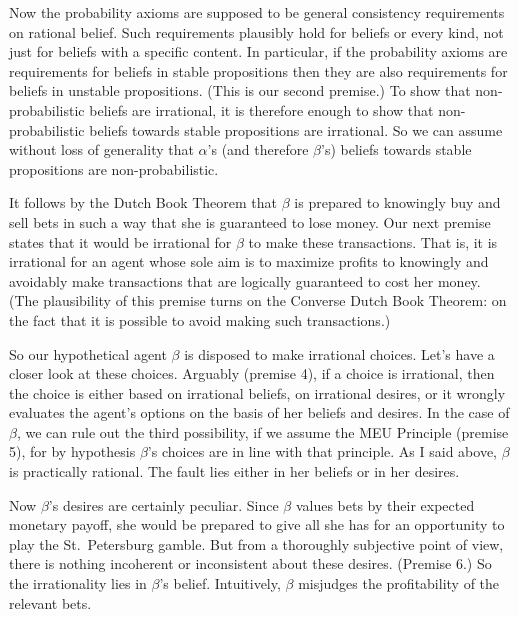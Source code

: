 
Now the probability axioms are supposed to be general consistency
requirements on rational belief. Such requirements plausibly hold for
beliefs or every kind, not just for beliefs with a specific
content. In particular, if the probability axioms are requirements for
beliefs in stable propositions then they are also requirements for
beliefs in unstable propositions. (This is our second premise.) To
show that non-probabilistic beliefs are irrational, it is therefore
enough to show that non-probabilistic beliefs towards stable
propositions are irrational. So we can assume without loss of
generality that $\alpha$'s (and therefore $\beta$'s) beliefs towards
stable propositions are non-probabilistic.

It follows by the Dutch Book Theorem that $\beta$ is prepared to
knowingly buy and sell bets in such a way that she is guaranteed to
lose money. Our next premise states that it would be irrational for
$\beta$ to make these transactions. That is, it is irrational for an
agent whose sole aim is to maximize profits to knowingly and avoidably
make transactions that are logically guaranteed to cost her
money. (The plausibility of this premise turns on the Converse Dutch
Book Theorem: on the fact that it is possible to avoid making such
transactions.)

So our hypothetical agent $\beta$ is disposed to make irrational
choices. Let's have a closer look at these choices. Arguably (premise
4), if a choice is irrational, then the choice is either based on
irrational beliefs, on irrational desires, or it wrongly evaluates the
agent's options on the basis of her beliefs and desires. In the case
of $\beta$, we can rule out the third possibility, if we assume the
MEU Principle (premise 5), for by hypothesis $\beta$'s choices are in
line with that principle. As I said above, $\beta$ is practically
rational. The fault lies either in her beliefs or in her desires.

Now $\beta$'s desires are certainly peculiar. Since $\beta$ values
bets by their expected monetary payoff, she would be prepared to give
all she has for an opportunity to play the St.\ Petersburg gamble. But
from a thoroughly subjective point of view, there is nothing
incoherent or inconsistent about these desires. (Premise 6.) So the
irrationality lies in $\beta$'s belief. Intuitively, $\beta$ misjudges the
profitability of the relevant bets.

